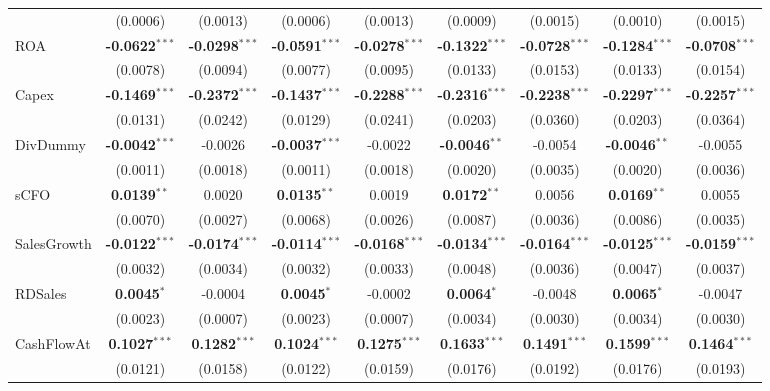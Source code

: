 \begin{landscape}
\begin{table}[H]
\begin{tabular}{lcccccccc}
 & (0.0006) & (0.0013) & (0.0006) & (0.0013) & (0.0009) & (0.0015) & (0.0010) & (0.0015) \\
ROA & \textbf{-0.0622}$^{***}$ & \textbf{-0.0298}$^{***}$ & \textbf{-0.0591}$^{***}$ & \textbf{-0.0278}$^{***}$ & \textbf{-0.1322}$^{***}$ & \textbf{-0.0728}$^{***}$ & \textbf{-0.1284}$^{***}$ & \textbf{-0.0708}$^{***}$ \\
 & (0.0078) & (0.0094) & (0.0077) & (0.0095) & (0.0133) & (0.0153) & (0.0133) & (0.0154) \\
Capex & \textbf{-0.1469}$^{***}$ & \textbf{-0.2372}$^{***}$ & \textbf{-0.1437}$^{***}$ & \textbf{-0.2288}$^{***}$ & \textbf{-0.2316}$^{***}$ & \textbf{-0.2238}$^{***}$ & \textbf{-0.2297}$^{***}$ & \textbf{-0.2257}$^{***}$ \\
 & (0.0131) & (0.0242) & (0.0129) & (0.0241) & (0.0203) & (0.0360) & (0.0203) & (0.0364) \\
DivDummy & \textbf{-0.0042}$^{***}$ & -0.0026 & \textbf{-0.0037}$^{***}$ & -0.0022 & \textbf{-0.0046}$^{**}$ & -0.0054 & \textbf{-0.0046}$^{**}$ & -0.0055 \\
 & (0.0011) & (0.0018) & (0.0011) & (0.0018) & (0.0020) & (0.0035) & (0.0020) & (0.0036) \\
sCFO & \textbf{0.0139}$^{**}$ & 0.0020 & \textbf{0.0135}$^{**}$ & 0.0019 & \textbf{0.0172}$^{**}$ & 0.0056 & \textbf{0.0169}$^{**}$ & 0.0055 \\
 & (0.0070) & (0.0027) & (0.0068) & (0.0026) & (0.0087) & (0.0036) & (0.0086) & (0.0035) \\
SalesGrowth & \textbf{-0.0122}$^{***}$ & \textbf{-0.0174}$^{***}$ & \textbf{-0.0114}$^{***}$ & \textbf{-0.0168}$^{***}$ & \textbf{-0.0134}$^{***}$ & \textbf{-0.0164}$^{***}$ & \textbf{-0.0125}$^{***}$ & \textbf{-0.0159}$^{***}$ \\
 & (0.0032) & (0.0034) & (0.0032) & (0.0033) & (0.0048) & (0.0036) & (0.0047) & (0.0037) \\
RDSales & \textbf{0.0045}$^{*}$ & -0.0004 & \textbf{0.0045}$^{*}$ & -0.0002 & \textbf{0.0064}$^{*}$ & -0.0048 & \textbf{0.0065}$^{*}$ & -0.0047 \\
 & (0.0023) & (0.0007) & (0.0023) & (0.0007) & (0.0034) & (0.0030) & (0.0034) & (0.0030) \\
CashFlowAt & \textbf{0.1027}$^{***}$ & \textbf{0.1282}$^{***}$ & \textbf{0.1024}$^{***}$ & \textbf{0.1275}$^{***}$ & \textbf{0.1633}$^{***}$ & \textbf{0.1491}$^{***}$ & \textbf{0.1599}$^{***}$ & \textbf{0.1464}$^{***}$ \\
 & (0.0121) & (0.0158) & (0.0122) & (0.0159) & (0.0176) & (0.0192) & (0.0176) & (0.0193) \\

\end{tabular}
\end{table}
\end{landscape}
